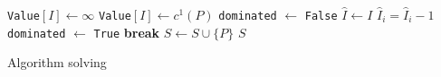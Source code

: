 \documentclass[11pt,english,a4paper,parskip=half-]{scrartcl}
\begin{document}
\begin{solution}
\begin{algorithm}[H]
\begin{algorithmic}[1]
			\State \texttt{Value}$[I] \gets \infty$
		\Else
			\State \texttt{Value}$[I] \gets c^1(P)$
			\State \texttt{dominated} $\gets $ \texttt{False}
				\State $\hat I \gets I$
				\State $\hat I_i = \hat I_i - 1$
				\label{line:dominatetest}
					\State \texttt{dominated} $\gets $ \texttt{True}
					\State\textbf{break}
				\EndIf
					\State $S \gets S \cup \{P\}$ \label{line:solutionincrease}
				\EndIf
			\EndFor
		\EndIf
	\EndFor
	\State	\Return $S$
	\end{algorithmic}
	\caption{Algorithm solving }\label{alg:summaxspp}
	\end{algorithm}
\end{solution}

\takehome
\end{document}
